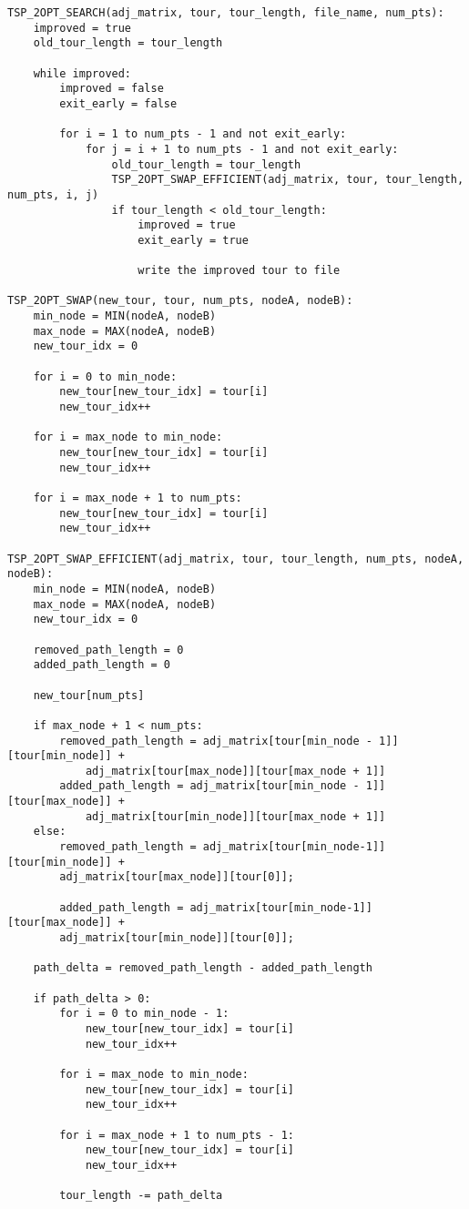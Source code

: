 \documentclass[../report/main.tex]{subfiles}
\begin{document}
\begin{verbatim}
TSP_2OPT_SEARCH(adj_matrix, tour, tour_length, file_name, num_pts):
    improved = true
    old_tour_length = tour_length

    while improved:
        improved = false
        exit_early = false

        for i = 1 to num_pts - 1 and not exit_early:
            for j = i + 1 to num_pts - 1 and not exit_early:
                old_tour_length = tour_length
                TSP_2OPT_SWAP_EFFICIENT(adj_matrix, tour, tour_length, num_pts, i, j)
                if tour_length < old_tour_length:
                    improved = true
                    exit_early = true

                    write the improved tour to file

TSP_2OPT_SWAP(new_tour, tour, num_pts, nodeA, nodeB):
    min_node = MIN(nodeA, nodeB)
    max_node = MAX(nodeA, nodeB)
    new_tour_idx = 0

    for i = 0 to min_node:
        new_tour[new_tour_idx] = tour[i]
        new_tour_idx++

    for i = max_node to min_node:
        new_tour[new_tour_idx] = tour[i]
        new_tour_idx++

    for i = max_node + 1 to num_pts:
        new_tour[new_tour_idx] = tour[i]
        new_tour_idx++

TSP_2OPT_SWAP_EFFICIENT(adj_matrix, tour, tour_length, num_pts, nodeA, nodeB):
    min_node = MIN(nodeA, nodeB)
    max_node = MAX(nodeA, nodeB)
    new_tour_idx = 0

    removed_path_length = 0
    added_path_length = 0

    new_tour[num_pts]

    if max_node + 1 < num_pts:
        removed_path_length = adj_matrix[tour[min_node - 1]][tour[min_node]] + 
            adj_matrix[tour[max_node]][tour[max_node + 1]]
        added_path_length = adj_matrix[tour[min_node - 1]][tour[max_node]] + 
            adj_matrix[tour[min_node]][tour[max_node + 1]]
    else:
        removed_path_length = adj_matrix[tour[min_node-1]][tour[min_node]] + 
        adj_matrix[tour[max_node]][tour[0]];

        added_path_length = adj_matrix[tour[min_node-1]][tour[max_node]] + 
        adj_matrix[tour[min_node]][tour[0]];

    path_delta = removed_path_length - added_path_length

    if path_delta > 0:
        for i = 0 to min_node - 1:
            new_tour[new_tour_idx] = tour[i]
            new_tour_idx++

        for i = max_node to min_node:
            new_tour[new_tour_idx] = tour[i]
            new_tour_idx++

        for i = max_node + 1 to num_pts - 1:
            new_tour[new_tour_idx] = tour[i]
            new_tour_idx++

        tour_length -= path_delta
\end{verbatim}
\end{document}
